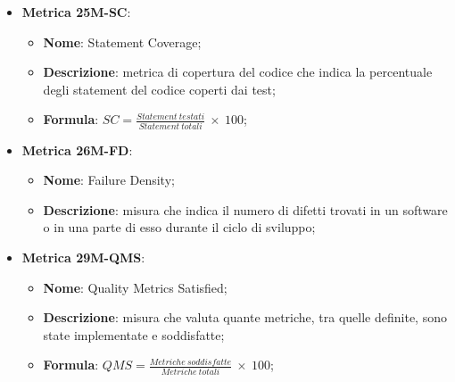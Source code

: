 \begin{itemize}
    \item \textbf{Metrica 25M-SC}:
    \begin{itemize}
        \item \textbf{Nome}: Statement Coverage;
        \item \textbf{Descrizione}: metrica di copertura del codice che indica la percentuale degli statement del codice coperti dai test;
        \item \textbf{Formula}: $SC = \frac{Statement\: testati}{Statement\: totali}\: \times \: 100$;
    \end{itemize}
\end{itemize}

\begin{itemize}
    \item \textbf{Metrica 26M-FD}:
    \begin{itemize}
        \item \textbf{Nome}: Failure Density;
        \item \textbf{Descrizione}: misura che indica il numero di difetti trovati in un software o in una parte di esso durante il ciclo di sviluppo;
    \end{itemize}
\end{itemize}

\begin{itemize}
    \item \textbf{Metrica 29M-QMS}:
    \begin{itemize}
        \item \textbf{Nome}: Quality Metrics Satisfied;
        \item \textbf{Descrizione}: misura che valuta quante metriche, tra quelle definite, sono state implementate e soddisfatte;
        \item \textbf{Formula}: $QMS = \frac{Metriche\: soddisfatte}{Metriche\: totali}\: \times \: 100$;
    \end{itemize}
\end{itemize}